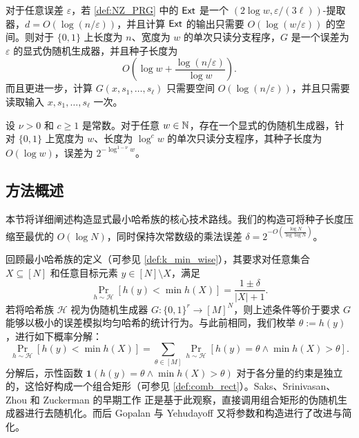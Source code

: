 \begin{lemma}
    对于任意误差 $\varepsilon$，若 \cref{def:NZ_PRG} 中的 $\mathsf{Ext}$ 是一个 $(2 \log w, \varepsilon / (3 \ell))$-提取器，$d = O(\log (n / \varepsilon))$，并且计算 $\mathsf{Ext}$ 的输出只需要 $O(\log (w / \varepsilon))$ 的空间。则对于 $\{0, 1\}$ 上长度为 $n$、宽度为 $w$ 的单次只读分支程序，$G$ 是一个误差为 $\varepsilon$ 的显式伪随机生成器，并且种子长度为
    $$
    O\left( \log w + \frac{\log (n / \varepsilon)}{\log w} \right).
    $$
    而且更进一步，计算 $G(x, s_1, \ldots, s_\ell)$ 只需要空间 $O(\log (n / \varepsilon))$，并且只需要读取输入 $x, s_1, \ldots, s_\ell$ 一次。
\end{lemma}

\begin{theorem}
    设 $\nu > 0$ 和 $c \ge 1$ 是常数。对于任意 $w \in \mathbb{N}$，存在一个显式的伪随机生成器，针对 $\{0, 1\}$ 上宽度为 $w$、长度为 $\log^c w$ 的单次只读分支程序，其种子长度为 $O(\log w)$，误差为 $2^{-\log^{1 - \nu} w}$。
\end{theorem}

\subsection{方法概述}\label{sec:overview}

本节将详细阐述构造显式最小哈希族的核心技术路线。我们的构造可将种子长度压缩至最优的 $O(\log N)$，同时保持次常数级的乘法误差 $\delta = 2^{-O\left(\frac{\log N}{\log \log N}\right)}$。

回顾最小哈希族的定义（可参见 \cref{def:k_min_wise}），其要求对任意集合 $X \subseteq [N]$ 和任意目标元素 $y \in [N] \setminus X$，满足
$$
\Pr_{h \sim \mathcal{H}}[h(y) < \min h(X)] = \frac{1 \pm \delta}{|X| + 1}.
$$
若将哈希族 $\mathcal{H}$ 视为伪随机生成器 $G: \{0,1\}^r \to [M]^N$，则上述条件等价于要求 $G$ 能够以极小的误差模拟均匀哈希的统计行为。与此前相同，我们枚举 $\theta := h(y)$，进行如下概率分解：
\begin{equation}\label{eq:overview_decomp}
\Pr_{h \sim \mathcal{H}}[h(y) < \min h(X)] = \sum_{\theta \in [M]} \Pr_{h \sim \mathcal{H}}[h(y) = \theta \wedge \min h(X) > \theta].
\end{equation}
分解后，示性函数 $\mathbf{1}(h(y) = \theta \wedge \min h(X) > \theta)$ 对于各分量的约束是独立的，这恰好构成一个组合矩形（可参见 \cref{def:comb_rect}）。Saks、Srinivasan、Zhou 和 Zuckerman 的早期工作 \cite{SSZZ00_connection_CR_min_wise} 正是基于此观察，直接调用组合矩形的伪随机生成器进行去随机化。而后 Gopalan 与 Yehudayoff \cite{GY20_PRG_CR_SOTA} 又将参数和构造进行了改进与简化。

